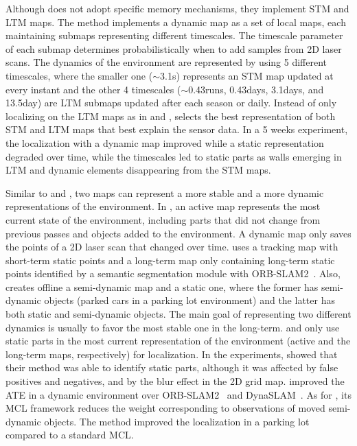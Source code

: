 Although \cite{biber-duckett:2009:0278364908096286} does not adopt specific memory mechanisms, they implement STM and LTM maps. The method implements a dynamic map as a set of local maps, each maintaining submaps representing different timescales. The timescale parameter of each submap determines probabilistically when to add samples from 2D laser scans.
The dynamics of the environment are represented by using 5 different timescales, where the smaller one ($\sim$3.1s) represents an STM map updated at every instant and the other 4 timescales ($\sim$0.43runs, 0.43days, 3.1days, and 13.5day) are LTM submaps updated after each season or daily. Instead of only localizing on the LTM maps as in \cite{dayoub-et-al:2011:013} and \cite{bacca-et-al:2013:003}, \cite{biber-duckett:2009:0278364908096286} selects the best representation of both STM and LTM maps that best explain the sensor data.
In a 5 weeks experiment, the localization with a dynamic map improved while a static representation degraded over time, while the timescales led to static parts as walls emerging in LTM and dynamic elements disappearing from the STM maps.

Similar to \cite{dayoub-et-al:2011:013} and \cite{bacca-et-al:2013:003}, two maps can represent a more stable and a more dynamic representations of the environment.
In \cite{walcott-bryant-et-al:2012:6385561}, an active map represents the most current state of the environment, including parts that did not change from previous passes and objects added to the environment. A dynamic map only saves the points of a 2D laser scan that changed over time.
\cite{wang-et-al:2019:8793499} uses a tracking map with short-term static points and a long-term map only containing long-term static points identified by a semantic segmentation module with ORB-SLAM2~\parencite{discussion:orb-slam2}.
Also, \cite{zhu-et-al:2021:9561584} creates offline a semi-dynamic map and a static one, where the former has semi-dynamic objects (parked cars in a parking lot environment) and the latter has both static and semi-dynamic objects.
The main goal of representing two different dynamics is usually to favor the most stable one in the long-term.
\cite{walcott-bryant-et-al:2012:6385561} and \cite{wang-et-al:2019:8793499} only use static parts in the most current representation of the environment (active and the long-term maps, respectively) for localization.
In the experiments, \cite{walcott-bryant-et-al:2012:6385561} showed that their method was able to identify static parts, although it was affected by false positives and negatives, and by the blur effect in the 2D grid map.
\cite{wang-et-al:2019:8793499} improved the ATE in a dynamic environment over ORB-SLAM2~\parencite{discussion:orb-slam2} and DynaSLAM~\parencite{bescos-et-al:2018:2860039}.
As for \cite{zhu-et-al:2021:9561584}, its MCL framework reduces the weight corresponding to observations of moved semi-dynamic objects. The method improved the localization in a parking lot compared to a standard MCL.



